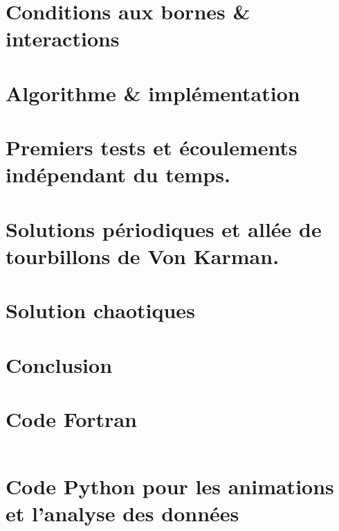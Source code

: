 \documentclass[unnumsec,webpdf,contemporary,large]{oup-authoring-template}%
\theoremstyle{thmstyleone}%
\theoremstyle{thmstyletwo}%
\theoremstyle{thmstylethree}%
\begin{document}
  \section{Conditions aux bornes \& interactions}\label{seq:Bc}
    

  \section{Algorithme \& implémentation}\label{seq:Al&i}
    
  
  \section{Premiers tests et écoulements indépendant du temps.}
    
  
  \section{Solutions périodiques et allée de tourbillons de Von Karman.}
    
    
  \section{Solution chaotiques}
    
  
  \section{Conclusion}
    
  
  \vfill  
  \newpage
  \vfill

  
  
    
 
  \vfill
  \newpage

  \vspace{10cm}

  \onecolumn
  \section{Code {\sc Fortran}}
    \inputminted{fortran}{Codes/windtunnel.f90}
  
  \vfill
  \newpage
  \section{Code {\sc Python} pour les animations et l'analyse des données}
\end{document}
